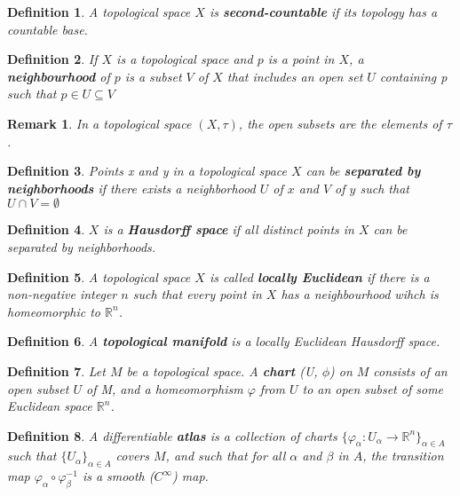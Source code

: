 \documentclass[12pt]{article}
\newcommand{\real}{\mathbb{R}}
\newcommand\inv[1]{#1^{-1}}
\newcommand\set[1]{\{#1\}}
\newtheorem{defn}{Definition}[thm]
\newtheorem*{remark}{Remark}
\begin{document}
\begin{defn}
  A topological space $X$ is \textbf{second-countable} if its topology has a countable base.
\end{defn}

\begin{defn}
  If $X$ is a topological space and $p$ is a point in $X$, a \textbf{neighbourhood}
  of $p$ is a subset $V$ of $X$ that includes an open set $U$ containing p such that $ p \in U \subseteq V$
\end{defn}
\begin{remark}
  In a topological space $(X, \tau)$, the open subsets are the elements of $\tau$.
\end{remark}
\begin{defn}
  Points x and y in a topological space $X$ can be \textbf{separated by neighborhoods}
  if there exists a neighborhood $U$ of $x$ and $V$ of $y$ such that $U \cap V = \emptyset$
\end{defn}
\begin{defn}
  $X$ is a \textbf{Hausdorff space} if all distinct points in $X$ can be separated by neighborhoods.
\end{defn}
\begin{defn}
  A topological space $X$  is called \textbf{locally Euclidean} if there is a non-negative integer $n$ such that every point in $X$ has a neighbourhood wihch is homeomorphic to $\real^n$.
\end{defn}

\begin{defn}
  A \textbf{topological manifold} is a locally Euclidean Hausdorff space. 
\end{defn}
\begin{defn}
  Let $M$  be a topological space. A \textbf{chart} (U, $\phi$) on $M$ consists of an open subset $U$ of M, and a homeomorphism $\varphi$ from $U$ to an open subset of some Euclidean space $\real^n$.
\end{defn}

\begin{defn}
  A differentiable  \textbf{atlas}  is a collection of charts $\set{\varphi_{\alpha} : U_{\alpha} \to  \real^n}_{\alpha \in A}$ such that $\set{U_{\alpha}}_{\alpha \in A}$  covers $M$, and such  that for all  $\alpha$
  and $\beta$ in $A$, the transition map $\varphi_{\alpha} \circ \inv{\varphi_{\beta}}$ is a smooth ($C^{\infty}$) map.
\end{defn}

\end{document}
